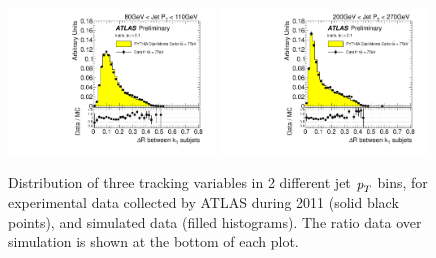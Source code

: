 \begin{figure}[tp]
\includegraphics[width=0.49\textwidth]{FIGS/dataMC/FullDataVarDRktaxisPT080.pdf}
\includegraphics[width=0.49\textwidth]{FIGS/dataMC/FullDataVarDRktaxisPT200.pdf}  
\caption{ Distribution of three tracking variables in 2 different jet ${\emph{p}_{T}}$ bins, for experimental data  collected by ATLAS during 2011 (solid black points), and simulated data (filled histograms). The ratio data over simulation is shown at the bottom of each plot.}
\label{fig:datamcinputvars}
\end{figure}



